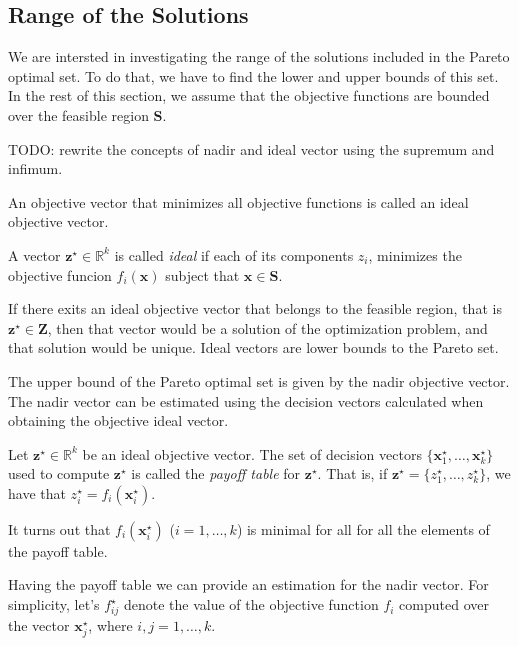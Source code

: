 {%

\subsection{Range of the Solutions}
\label{sec:range_solutions}

We are intersted in investigating the range of the solutions included in the Pareto optimal set. To do that, we have to find the lower and upper bounds of this set. In the rest of this section, we assume that the objective functions are bounded over the feasible region $\mathbf{S}$.

{\color{red} TODO: rewrite the concepts of nadir and ideal vector using the supremum and infimum.}

An objective vector that minimizes all objective functions is called an ideal objective vector.

\begin{definition}
A vector $\mathbf{z}^\star \in \mathbb{R}^k$ is called \emph{ideal} if each of its components $z_i$, minimizes the objective funcion $f_i \left( \mathbf{x} \right)$ subject that $\mathbf{x} \in \mathbf{S}$.
\end{definition}

If there exits an ideal objective vector that belongs to the feasible region, that is $\mathbf{z}^\star \in \mathbf{Z}$, then that vector would be a solution of the optimization problem, and that solution would be unique. Ideal vectors are lower bounds to the Pareto set.

The upper bound of the Pareto optimal set is given by the nadir objective vector. The nadir vector can be estimated using the decision vectors calculated when obtaining the objective ideal vector.

\begin{definition}
Let $\mathbf{z}^\star \in \mathbb{R}^k$ be an ideal objective vector. The set of decision vectors $\{ \mathbf{x}^\star_1, \ldots, \mathbf{x}^\star_k \}$ used to compute $\mathbf{z}^\star$ is called the \emph{payoff table} for $\mathbf{z}^\star$. That is, if $\mathbf{z}^\star = \{ z^\star_1, \ldots, z^\star_k \}$, we have that $z^\star_i = f_i \left( \mathbf{x}^\star_i \right)$.
\end{definition} 

It turns out that $f_i \left( \mathbf{x}^\star_i \right)$ ($i = 1, \ldots, k$) is minimal for all for all the elements of the payoff table.

Having the payoff table we can provide an estimation for the nadir vector. For simplicity, let's $f^\star_{ij}$ denote the value of the objective function $f_i$ computed over the vector $\mathbf{x}^\star_j$, where $i, j = 1, \ldots, k$.

}
